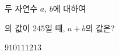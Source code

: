 두 자연수 $a$, $b$에 대하여\par\smallskip{}\par\smallskip\noindent 의 값이 $245$일 때, $a+b$의 값은?
\begin{choices32}{$9$}{$10$}{$11$}{$12$}{$13$}\end{choices32}
